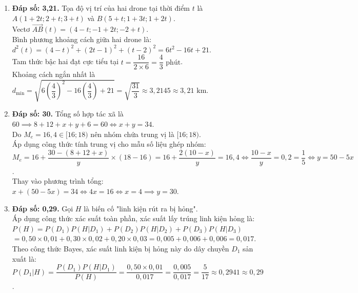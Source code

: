 \documentclass[12pt,a4paper]{article}
\begin{document}
\begin{enumerate}[label=\textbf{Câu \arabic*:}, leftmargin=*]
\item \textbf{Đáp số: 3,21.} Tọa độ vị trí của hai drone tại thời điểm $t$ là $A(1 + 2t; 2 + t; 3 + t)$ và $B(5 + t; 1 + 3t; 1 + 2t)$.\\
Vectơ $\overrightarrow{AB}(t) = (4 - t; -1 + 2t; -2 + t)$.\\
Bình phương khoảng cách giữa hai drone là:\\
$d^2(t) = (4 - t)^2 + (2t - 1)^2 + (t - 2)^2 = 6t^2 - 16t + 21$.\\
Tam thức bậc hai đạt cực tiểu tại $t = \dfrac{16}{2 \times 6} = \dfrac{4}{3}\text{ phút}$.\\
Khoảng cách ngắn nhất là $d_{\min} = \sqrt{6\left(\dfrac{4}{3}\right)^2 - 16\left(\dfrac{4}{3}\right) + 21} = \sqrt{\dfrac{31}{3}} \approx 3{,}2145 \approx 3{,}21\text{ km}$.

\item \textbf{Đáp số: 30.} Tổng số hợp tác xã là $60 \implies 8 + 12 + x + y + 6 = 60 \iff x + y = 34$.\\
Do $M_e = 16{,}4 \in [16; 18)$ nên nhóm chứa trung vị là $[16; 18)$.\\
Áp dụng công thức tính trung vị cho mẫu số liệu ghép nhóm:\\
$M_e = 16 + \dfrac{30 - (8 + 12 + x)}{y} \times (18 - 16) = 16 + \dfrac{2(10 - x)}{y} = 16{,}4 \iff \dfrac{10 - x}{y} = 0{,}2 = \dfrac{1}{5} \iff y = 50 - 5x$.\\
Thay vào phương trình tổng: $x + (50 - 5x) = 34 \iff 4x = 16 \iff x = 4 \implies y = 30$.

\item \textbf{Đáp số: 0,29.} Gọi $H$ là biến cố "linh kiện rút ra bị hỏng".\\
Áp dụng công thức xác suất toàn phần, xác suất lấy trúng linh kiện hỏng là:\\
$P(H) = P(D_1)P(H|D_1) + P(D_2)P(H|D_2) + P(D_3)P(H|D_3)$\\
$= 0{,}50 \times 0{,}01 + 0{,}30 \times 0{,}02 + 0{,}20 \times 0{,}03 = 0{,}005 + 0{,}006 + 0{,}006 = 0{,}017$.\\
Theo công thức Bayes, xác suất linh kiện bị hỏng này do dây chuyền $D_1$ sản xuất là:\\
$P(D_1|H) = \dfrac{P(D_1)P(H|D_1)}{P(H)} = \dfrac{0{,}50 \times 0{,}01}{0{,}017} = \dfrac{0{,}005}{0{,}017} = \dfrac{5}{17} \approx 0{,}2941 \approx 0{,}29$.


\end{enumerate}
\end{document}
